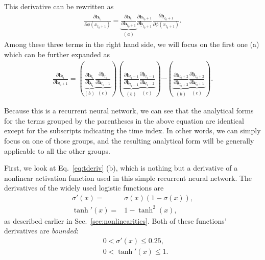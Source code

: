 \documentclass{report}
\newcommand{\vect}[1]{\mathbf{#1}}
\newcommand{\vh}[0]{\vect{h}}
\begin{document}
This derivative can be rewritten as
\begin{align*}
    \frac{\partial \vh_{l_1}}{\partial \phi\left(x_{l_0+1}\right)} = 
    \underbrace{\frac{\partial \vh_{l_1}}{\partial
    \vh_{l_0+1}}}_{(a)}
    \frac{\partial \vh_{l_0+1}}{\partial \underline{\vh}_{l_0+1}}
    \frac{\partial \underline{\vh}_{l_0+1}}{\partial
    \phi\left(x_{l_0+1}\right)}.
\end{align*}
Among these three terms in the right hand side, we will focus on the first one
(a) which can be further expanded as
\begin{align}
    \label{eq:tderiv}
    \frac{\partial \vh_{l_1}}{\partial \vh_{l_0+1}} = 
    \left(
    \underbrace{\frac{\partial \vh_{l_1}}{\partial \underline{\vh}_{l_1}}}_{(b)}
    \underbrace{\frac{\partial \underline{\vh}_{l_1}}{\partial \vh_{l_1-1}}}_{(c)}
\right)
\left(
    \underbrace{\frac{\partial \vh_{l_1-1}}{\partial
    \underline{\vh}_{l_1-1}}}_{(b)}
        \underbrace{\frac{\partial \underline{\vh}_{l_1-1}}{\partial
        \vh_{l_1-2}}}_{(c)}
\right)
    \cdots
\left(
    \underbrace{\frac{\partial \vh_{l_0+2}}{\partial
    \underline{\vh}_{l_0+2}}}_{(b)}
        \underbrace{\frac{\partial \underline{\vh}_{l_0+2}}{\partial
        \vh_{l_0+1}}}_{(c)}
    \right).
\end{align}

Because this is a recurrent neural network, we can see that the analytical forms
for the terms grouped by the parentheses in the above equation are identical
except for the subscripts indicating the time index. In other words, we can
simply focus on one of those groups, and the resulting analytical form will be
generally applicable to all the other groups.

First, we look at Eq.~\eqref{eq:tderiv} (b), which is nothing but a derivative
of a nonlinear activation function used in this simple recurrent neural network.
The derivatives of the widely used logistic functions are 
\begin{align*}
    \sigma'(x) =& \sigma(x) (1 - \sigma(x)), \\
    \tanh'(x) =& 1 - \tanh^2(x),
\end{align*}
as described earlier in Sec.~\ref{sec:nonlinearities}. 
Both of these functions' derivatives are {\em bounded}:
\begin{align}
    \label{eq:sigmoid_bound}
    &0 < \sigma'(x) \leq 0.25, \\
    \label{eq:tanh_bound}
    &0 < \tanh'(x) \leq 1.
\end{align}
\end{document}
